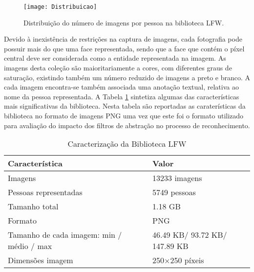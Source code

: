 \begin{figure}[ht]
  \begin{center}
    \leavevmode
    \texttt{[image: Distribuicao]}
    \caption{Distribuição do número de imagens por pessoa na biblioteca LFW.}
    \label{fig:distribuicaoLFW}
  \end{center}
\end{figure}

Devido à inexistência de restrições na captura de imagens, cada fotografia pode possuir mais do que uma face representada, sendo que a face que contém o píxel central deve ser considerada como a entidade representada na imagem. As imagens desta coleção são maioritariamente a cores, com diferentes graus de saturação, existindo também um número reduzido de imagens a preto e branco. A cada imagem encontra-se também associada uma anotação textual, relativa ao nome da pessoa representada. A Tabela \ref{tab:lfw} sintetiza algumas das características mais significativas da biblioteca. Nesta tabela são reportadas as caraterísticas da biblioteca no formato de imagens PNG uma vez que este foi o formato utilizado para avaliação do impacto dos filtros de abstração no processo de reconhecimento.

\begin{center}
\begin{table}
	\caption{Caracterização da Biblioteca LFW}
	\begin{center}
    \begin{tabular}{ll}
    \hline
    Característica                            & Valor            \\ \hline
    Imagens                                   & 13233 imagens    \\
    Pessoas representadas                     & 5749 pessoas     \\
    Tamanho total                             & 1.18 GB          \\
    Formato                                   & PNG              \\
    Tamanho de cada imagem: min / médio / max & 46.49 KB/ 93.72 KB/ 147.89 KB\\
    Dimensões imagem                          & 250$\times$250 píxeis \\
    \hline
    \end{tabular}
	\label{tab:lfw}
	\end{center}
\end{table}
\end{center}

